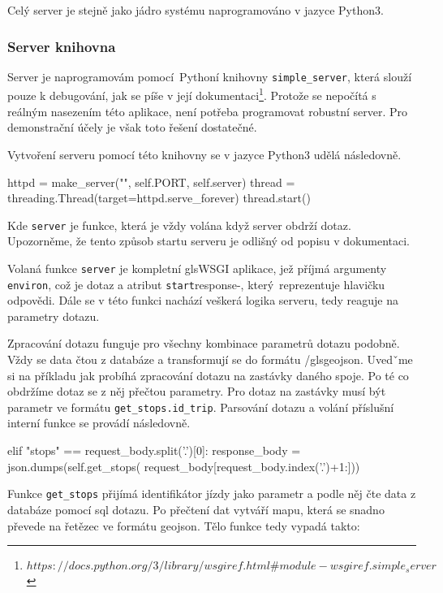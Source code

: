 Celý server je stejně jako jádro systému naprogramováno v jazyce Python3.

\subsubsection{Server knihovna}

Server je naprogramovám pomocí Pythoní knihovny \verb-simple_server-, která slouží pouze k debugování, jak se píše v její dokumentaci\footnote{$https://docs.python.org/3/library/wsgiref.html\#module-wsgiref.simple_server$}. Protože se nepočítá s reálným nasezením této aplikace, není potřeba programovat robustní server. Pro demonstrační účely je však toto řešení dostatečné.

\bigbreak

Vytvoření serveru pomocí této knihovny se v jazyce Python3 udělá následovně.

\begin{code}[frame=none]
httpd = make_server("", self.PORT, self.server)
thread = threading.Thread(target=httpd.serve_forever)
thread.start()
\end{code}

Kde \verb-server- je funkce, která je vždy volána když server obdrží dotaz. Upozorněme, že tento způsob startu serveru je odlišný od popisu v dokumentaci.

\bigbreak

Volaná funkce \verb-server- je kompletní gls{WSGI} aplikace, jež příjmá argumenty \verb-environ-, což je dotaz a atribut \verb-start-response-, který reprezentuje hlavičku odpovědi. Dále se v této funkci nachází veškerá logika serveru, tedy reaguje na parametry dotazu.

\bigbreak

Zpracování dotazu funguje pro všechny kombinace parametrů dotazu podobně. Vždy se data čtou z databáze a transformují se do formátu /gls{geojson}. Uvedˇme si na příkladu jak probíhá zpracování dotazu na zastávky daného spoje. Po té co obdržíme dotaz se z něj přečtou parametry. Pro dotaz na zastávky musí být parametr ve formátu \verb-get_stops.id_trip-. Parsování dotazu a volání příslušní interní funkce se provádí následovně.

\begin{code}[frame=none]
elif "stops" == request_body.split('.')[0]:
  response_body = json.dumps(self.get_stops(
    request_body[request_body.index('.')+1:]))
\end{code}

Funkce \verb-get_stops- přijímá identifikátor jízdy jako parametr a podle něj čte data z databáze pomocí \gls{sql} dotazu. Po přečtení dat vytváří mapu, která se snadno převede na řetězec ve formátu \gls{geojson}. Tělo funkce tedy vypadá takto:

